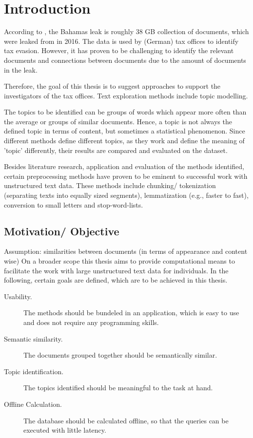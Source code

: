 \chapter{Introduction}\label{ch:introduction}

According to \cite{data-corpus-bahamas-leaks}, the Bahamas leak is roughly 38 GB collection of documents, which were leaked from in 2016.
The data is used by (German) tax offices to identify tax evasion.
However, it has proven to be challenging to identify the relevant documents and connections between documents due to the amount of documents in the leak.

Therefore, the goal of this thesis is to suggest approaches to support the investigators of the tax offices.
Text exploration methods include topic modelling.

The topics to be identified can be groups of words which appear more often than the average or groups of similar documents.
Hence, a topic is not always the defined topic in terms of content, but sometimes a statistical phenomenon.
Since different methods define different topics, as they work and define the meaning of 'topic' differently, 
their results are compared and evaluated on the dataset.

Besides literature research, application and evaluation of the methods identified, 
certain preprocessing methods have proven to be eminent to successful work with unstructured text data.
These methods include chunking/ tokenization (separating texts into equally sized segments), lemmatization (e.g., faster to fast), 
conversion to small letters and stop-word-lists.

\section{Motivation/ Objective}\label{sec:motivation}

Assumption: similarities between documents (in terms of appearance and content wise)
On a broader scope this thesis aims to provide computational means to facilitate the work with large unstructured text data for individuals.
In the following, certain goals are defined, which are to be achieved in this thesis.

\begin{description}
    \item[Usability.]
    The methods should be bundeled in an application, which is easy to use and does not require any programming skills.
    \item[Semantic similarity.]
    The documents grouped together should be semantically similar.
    \item[Topic identification.]
    The topics identified should be meaningful to the task at hand.  
    \item[Offline Calculation.]
    The database should be calculated offline, so that the queries can be executed with little latency.
\end{description}


